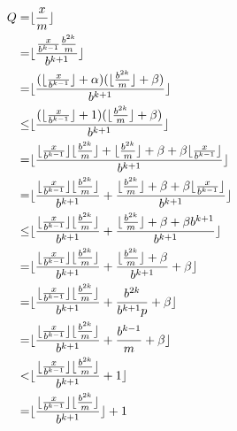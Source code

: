 \documentclass{article}
\DeclarePairedDelimiter\floor{\lfloor}{\rfloor}
\begin{document}
\begin{align}
    Q = & \floor{\frac{x}{m}}\\ 
    = & \floor{\frac{\frac{x}{b^{k-1}}\frac{b^{2k}}{m}} {b^{k+1}}} \\
    = & \floor{
        \frac
        {
            (\floor{\frac{x}{b^{k-1}}} + \alpha
            )
            (
            \floor{\frac{b^{2k}}{m}} + \beta
            )
        }
        {b ^{k+1}}
    } \\
    \le & \floor{
        \frac
        {
            (\floor{\frac{x}{b^{k-1}}} + 1
            )
            (
            \floor{\frac{b^{2k}}{m}} + \beta
            )
        }
        {b ^{k+1}}
    } \\ 
    = & \floor{
        \frac
        {
            \floor{\frac{x}{b^{k-1}}} \floor{\frac{b^{2k}}{m}} + \floor{\frac{b^{2k}}{m}} + \beta + \beta \floor{\frac{x}{b^{k-1}}}
        }
        {b ^{k+1}}
    } \\ 
    = & \floor{
        \frac
        {
            \floor{\frac{x}{b^{k-1}}} \floor{\frac{b^{2k}}{m}}
        }
        {b ^{k+1}}
        +
        \frac
        {
            \floor{\frac{b^{2k}}{m}} + \beta + \beta \floor{\frac{x}{b^{k-1}}}
        }
        {b ^{k+1}}
    } \\
    \le & \floor{
        \frac
        {
            \floor{\frac{x}{b^{k-1}}} \floor{\frac{b^{2k}}{m}}
        }
        {b ^{k+1}}
        +
        \frac
        {
            \floor{\frac{b^{2k}}{m}} + \beta + \beta {b^{k+1}}
        }
        {b ^{k+1}}
    } \\
    = & \floor{
        \frac
        {
            \floor{\frac{x}{b^{k-1}}} \floor{\frac{b^{2k}}{m}}
        }
        {b ^{k+1}}
        +
        \frac
        {
            \floor{\frac{b^{2k}}{m}} + \beta
        }
        {b ^{k+1}} + \beta
    } \\
    = & \floor{
        \frac
        {
            \floor{\frac{x}{b^{k-1}}} \floor{\frac{b^{2k}}{m}}
        }
        {b ^{k+1}}
        +
        \frac
        {
            b^{2k}
        }
        {b ^{k+1}p} + \beta
    } \\
    = & \floor{
        \frac
        {
            \floor{\frac{x}{b^{k-1}}} \floor{\frac{b^{2k}}{m}}
        }
        {b ^{k+1}}
        +
        \frac
        {
            b^{k-1}
        }
        {m} + \beta
    } \\
    < & \floor{
        \frac
        {
            \floor{\frac{x}{b^{k-1}}} \floor{\frac{b^{2k}}{m}}
        }
        {b ^{k+1}}
        +
        1
    } \\
    = & \floor{
        \frac
        {
            \floor{\frac{x}{b^{k-1}}} \floor{\frac{b^{2k}}{m}}
        }
        {b ^{k+1}}
        }
        +
        1
\end{align}
\end{document}
